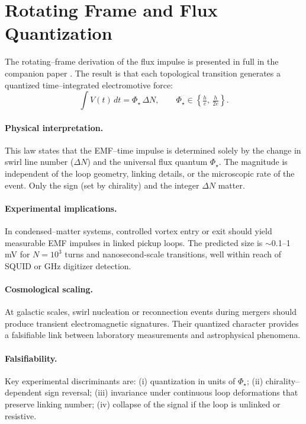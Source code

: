 \documentclass[11pt]{article}
\begin{document}
    \section{Rotating Frame and Flux Quantization}
    \label{sec:rotating-frame-and-flux-quantization}

        The rotating–frame derivation of the flux impulse is presented in full in the companion paper
        \cite{Iskandarani2025EMG}. The result is that each topological transition generates a quantized
        time–integrated electromotive force:
        \[
        \int V(t)\,dt = \Phi_\star \,\Delta N,
        \qquad
        \Phi_\star \in \left\{ \tfrac{h}{e}, \,\tfrac{h}{2e} \right\}.
        \]

        \paragraph*{Physical interpretation.}
        This law states that the EMF–time impulse is determined solely by the change in swirl line number
        ($\Delta N$) and the universal flux quantum $\Phi_\star$. The magnitude is independent of the loop
        geometry, linking details, or the microscopic rate of the event. Only the sign (set by chirality) and
        the integer $\Delta N$ matter.

        \paragraph*{Experimental implications.}
        In condensed–matter systems, controlled vortex entry or exit should yield measurable EMF impulses in
        linked pickup loops. The predicted size is $\sim$0.1–1 mV for $N=10^3$ turns and nanosecond-scale transitions,
        well within reach of SQUID or GHz digitizer detection.

        \paragraph*{Cosmological scaling.}
        At galactic scales, swirl nucleation or reconnection events during mergers should produce transient
        electromagnetic signatures. Their quantized character provides a falsifiable link between laboratory
        measurements and astrophysical phenomena.

        \paragraph*{Falsifiability.}
        Key experimental discriminants are: (i) quantization in units of $\Phi_\star$; (ii) chirality–dependent
        sign reversal; (iii) invariance under continuous loop deformations that preserve linking number; (iv)
        collapse of the signal if the loop is unlinked or resistive.
\end{document}
